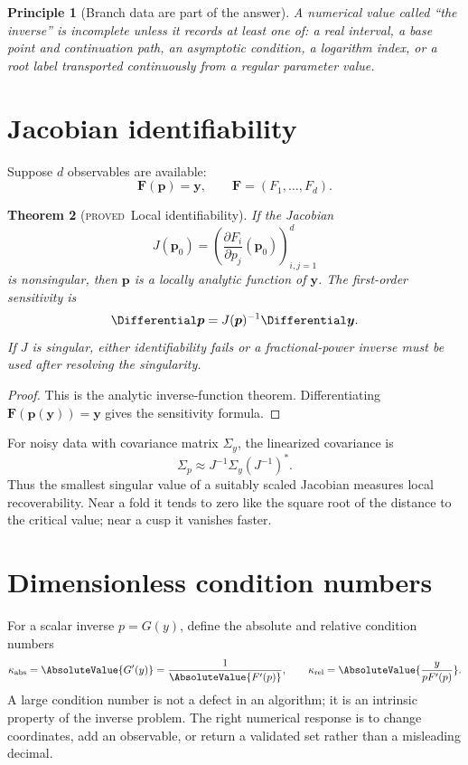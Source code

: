 \documentclass[11pt,letterpaper,oneside,openany]{book}
\newtheorem{theorem}{Theorem}[chapter]
\newtheorem{principle}[theorem]{Principle}
\theoremstyle{definition}
\theoremstyle{remark}
\newcommand{\statusproved}{\textcolor{provedgreen}{\textsc{proved}}}
\begin{document}
\begin{principle}[Branch data are part of the answer]
A numerical value called ``the inverse'' is incomplete unless it records at
least one of: a real interval, a base point and continuation path, an asymptotic
condition, a logarithm index, or a root label transported continuously from a
regular parameter value.
\end{principle}

\section{Jacobian identifiability}
Suppose \(d\) observables are available:
\[
 \bm F(\bm p)=\bm y,
 \qquad
 \bm F=(F_1,\ldots,F_d).
\]

\begin{theorem}[\statusproved\ Local identifiability]
If the Jacobian
\[
 J(\bm p_0)=\left(\frac{\partial F_i}{\partial p_j}(\bm p_0)\right)_{i,j=1}^d
\]
is nonsingular, then \(\bm p\) is a locally analytic function of \(\bm y\).
The first-order sensitivity is
\[
 \Differential\bm p=J(\bm p)^{-1}\Differential\bm y.
\]
If \(J\) is singular, either identifiability fails or a fractional-power
inverse must be used after resolving the singularity.
\end{theorem}
\begin{proof}
This is the analytic inverse-function theorem.  Differentiating
\(\bm F(\bm p(\bm y))=\bm y\) gives the sensitivity formula.
\end{proof}

For noisy data with covariance matrix \(\Sigma_y\), the linearized covariance
is
\[
 \Sigma_p\approx J^{-1}\Sigma_y(J^{-1})^*.
\]
Thus the smallest singular value of a suitably scaled Jacobian measures local
recoverability.  Near a fold it tends to zero like the square root of the
distance to the critical value; near a cusp it vanishes faster.

\section{Dimensionless condition numbers}
For a scalar inverse \(p=G(y)\), define the absolute and relative condition
numbers
\[
 \kappa_{\rm abs}=\AbsoluteValue{G'(y)}=\frac1{\AbsoluteValue{F'(p)}},
 \qquad
 \kappa_{\rm rel}=\AbsoluteValue{\frac{y}{pF'(p)}}.
\]
A large condition number is not a defect in an algorithm; it is an intrinsic
property of the inverse problem.  The right numerical response is to change
coordinates, add an observable, or return a validated set rather than a
misleading decimal.
\end{document}
